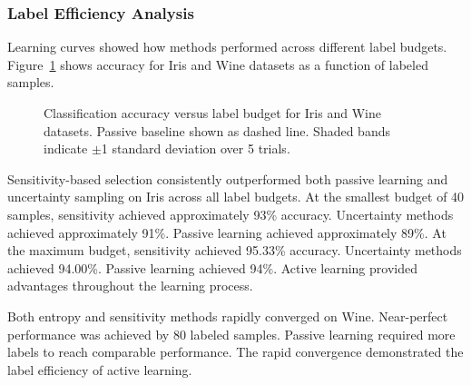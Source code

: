 \documentclass[conference]{IEEEtran}
\begin{document}
\subsubsection{Label Efficiency Analysis}

Learning curves showed how methods performed across different label budgets. Figure~\ref{fig:iris-compare} shows accuracy for Iris and Wine datasets as a function of labeled samples.

\begin{figure}[t]
\centering
{}
\hfill
{}
\caption{Classification accuracy versus label budget for Iris and Wine datasets. Passive baseline shown as dashed line. Shaded bands indicate $\pm$1 standard deviation over 5 trials.}
\label{fig:iris-compare}
\end{figure}

Sensitivity-based selection consistently outperformed both passive learning and uncertainty sampling on Iris across all label budgets. At the smallest budget of 40 samples, sensitivity achieved approximately 93\% accuracy. Uncertainty methods achieved approximately 91\%. Passive learning achieved approximately 89\%. At the maximum budget, sensitivity achieved 95.33\% accuracy. Uncertainty methods achieved 94.00\%. Passive learning achieved 94\%. Active learning provided advantages throughout the learning process.

Both entropy and sensitivity methods rapidly converged on Wine. Near-perfect performance was achieved by 80 labeled samples. Passive learning required more labels to reach comparable performance. The rapid convergence demonstrated the label efficiency of active learning.
\end{document}
